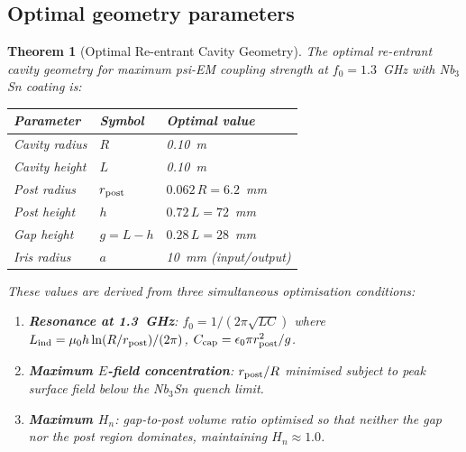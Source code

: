 \documentclass[11pt,twocolumn]{article}
\newtheorem{theorem}{Theorem}[section]
\begin{document}
\subsection{Optimal geometry parameters}
\label{sec:optimal_geometry}

\begin{theorem}[Optimal Re-entrant Cavity Geometry]
\label{thm:optimal_geometry}
The optimal re-entrant cavity geometry for maximum psi-EM coupling strength
at $f_0 = 1.3$~GHz with Nb$_3$Sn coating is:

\begin{center}
\begin{tabular}{lll}
\toprule
Parameter & Symbol & Optimal value \\
\midrule
Cavity radius & $R$ & 0.10~m \\
Cavity height & $L$ & 0.10~m \\
Post radius & $r_{\rm post}$ & $0.062\,R = 6.2$~mm \\
Post height & $h$ & $0.72\,L = 72$~mm \\
Gap height & $g = L-h$ & $0.28\,L = 28$~mm \\
Iris radius & $a$ & 10~mm (input/output) \\
\bottomrule
\end{tabular}
\end{center}

These values are derived from three simultaneous optimisation conditions:
\begin{enumerate}[nosep]
\item \textbf{Resonance at 1.3~GHz}: $f_0 = 1/(2\pi\sqrt{LC})$ where
      $L_{\rm ind} = \mu_0 h\ln(R/r_{\rm post})/(2\pi)$,
      $C_{\rm cap} = \epsilon_0\pi r_{\rm post}^2/g$.
\item \textbf{Maximum $E$-field concentration}: $r_{\rm post}/R$ minimised
      subject to peak surface field below the Nb$_3$Sn quench limit.
\item \textbf{Maximum $H_n$}: gap-to-post volume ratio optimised so that
      neither the gap nor the post region dominates, maintaining
      $H_n \approx 1.0$.
\end{enumerate}


\end{theorem}
\end{document}

